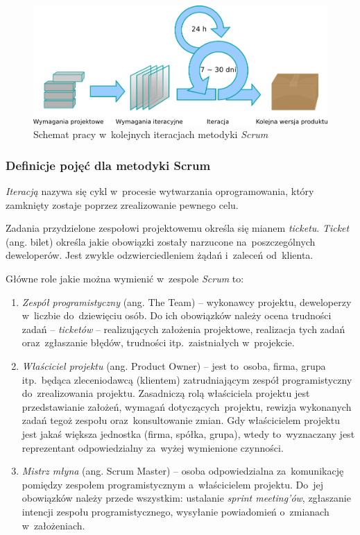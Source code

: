 \begin{figure}[!t]
\centering
\includegraphics[width=\textwidth]{obrazki/scrum.png}
\caption[Schemat pracy w metodyce \textit{Scrum}]{Schemat pracy w~kolejnych iteracjach metodyki \textit{Scrum} \cite{scrum.schema}}
\label{fig.rysunek.scrum}
\end{figure}

\subsubsection{Definicje pojęć dla metodyki Scrum} \label{scrum.definicje}

\textit{Iteracją} nazywa się cykl w~procesie wytwarzania oprogramowania, który zamknięty zostaje poprzez zrealizowanie pewnego celu.


Zadania przydzielone zespołowi projektowemu określa się mianem \textit{ticketu}. \textit{Ticket} (ang. bilet) określa jakie obowiązki zostały narzucone na~poszczególnych deweloperów. Jest zwykle odzwierciedleniem żądań i~zaleceń od~klienta.


Główne role jakie można wymienić w~zespole \textit{Scrum} to:

\begin{enumerate}
  \item \textit{Zespół programistyczny} (ang. The Team) -- wykonawcy projektu, deweloperzy w~liczbie do~dziewięciu osób. Do ich obowiązków należy ocena trudności zadań -- \textit{ticketów} -- realizujących założenia projektowe, realizacja tych zadań oraz~zgłaszanie błędów, trudności itp.~zaistniałych w~projekcie.
  \item \textit{Właściciel projektu} (ang. Product Owner) -- jest to~osoba, firma, grupa itp.~będąca zleceniodawcą (klientem) zatrudniającym zespół programistyczny do~zrealizowania projektu. Zasadniczą rolą właściciela projektu jest przedstawianie założeń, wymagań dotyczących~projektu, rewizja wykonanych zadań tegoż zespołu oraz~konsultowanie zmian. Gdy właścicielem projektu jest jakaś większa jednostka (firma, spółka, grupa), wtedy to~wyznaczany jest reprezentant odpowiedzialny za~wyżej wymienione czynności.
  \item \textit{Mistrz młyna} (ang. Scrum Master) -- osoba odpowiedzialna za~komunikację pomiędzy zespołem programistycznym a~właścicielem projektu. Do~jej obowiązków należy przede wszystkim: ustalanie \textit{sprint meeting'ów}, zgłaszanie intencji zespołu programistycznego, wysyłanie powiadomień o~zmianach w~założeniach.
\end{enumerate}

